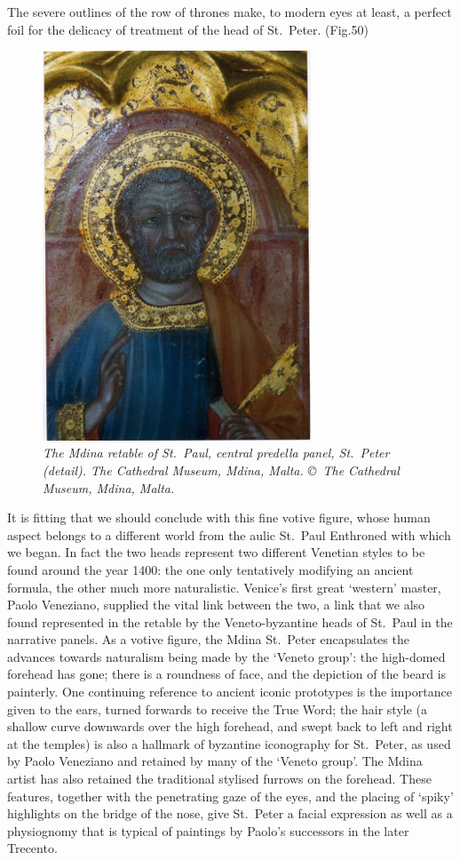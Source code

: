 \documentclass[a4paper,12pt]{article}
\begin{document}
The severe outlines of the row of thrones make, to modern eyes at
least, a perfect foil for the delicacy of treatment of the head of
St.~Peter. (Fig.50) 
\begin{figure}[htbp]
\centering
\includegraphics[width=8cm]{pics/fig50.png}
\caption[The Mdina retable of St.~Paul, central predella panel, St.~Peter
(detail)] 
{\it The Mdina retable of St.~Paul, central predella panel, St.~Peter
(detail). 
The Cathedral Museum, Mdina, Malta. \copyright\ The Cathedral Museum,
  Mdina, Malta.} 
\end{figure}
It is fitting that we should conclude with this
fine votive figure, whose human aspect belongs to a different world
from the aulic St.~Paul Enthroned with which we began. In fact the two
heads represent two different Venetian styles to be found around the
year 1400: the one only tentatively modifying an ancient formula, the
other much more naturalistic. Venice's first great `western' master,
Paolo Veneziano, supplied the vital link between the two, a link that
we also found represented in the retable by the Veneto-byzantine heads
of St.~Paul in the narrative panels. As a votive figure, the Mdina
St.~Peter encapsulates the advances towards naturalism being made by
the `Veneto group': the high-domed forehead has gone; there is a
roundness of face, and the depiction of the beard is painterly. One
continuing reference to ancient iconic prototypes is the importance
given to the ears, turned forwards to receive the True Word; the hair
style (a shallow curve downwards over the high forehead, and swept
back to left and right at the temples) is also a hallmark of byzantine
iconography for St.~Peter, as used by Paolo Veneziano and retained by
many of the `Veneto group'. The Mdina artist has also retained the
traditional stylised furrows on the forehead. These features, together
with the penetrating gaze of the eyes, and the placing of `spiky'
highlights on the bridge of the nose, give St.~Peter a facial
expression as well as a physiognomy that is typical of paintings by
Paolo's successors in the later Trecento.
\end{document}
